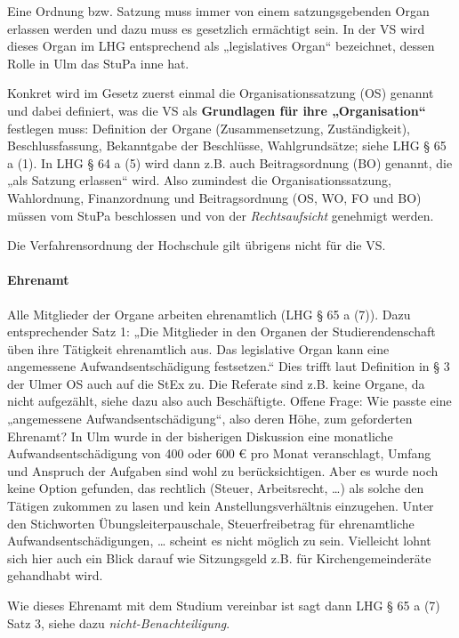 \documentclass[
10pt,
a4paper,
twoside,								%
titlepage=false,							%
draft=false								%
]{scrartcl}
\begin{document}
Eine Ordnung bzw. Satzung muss immer von einem satzungsgebenden Organ erlassen werden und dazu muss es gesetzlich ermächtigt sein. In der VS wird dieses Organ im LHG entsprechend als „legislatives Organ“ bezeichnet, dessen Rolle in Ulm das StuPa inne hat.


Konkret wird im Gesetz zuerst einmal die Organisationssatzung (OS) genannt und dabei definiert, was die VS als \textbf{Grundlagen für ihre „Organisation“} festlegen muss: Definition der Organe (Zusammensetzung, Zuständigkeit), Beschlussfassung, Bekanntgabe der Beschlüsse, Wahlgrundsätze; siehe LHG § 65 a (1). In LHG § 64 a (5) wird dann z.B. auch Beitragsordnung (BO) genannt, die „als Satzung erlassen“ wird. Also zumindest die Organisationssatzung, Wahlordnung, Finanzordnung und Beitragsordnung (OS, WO, FO und BO) müssen vom StuPa beschlossen und von der \emph{Rechtsaufsicht} genehmigt werden.

Die Verfahrensordnung der Hochschule gilt übrigens nicht für die VS.


\paragraph{Ehrenamt}

Alle Mitglieder der Organe arbeiten ehrenamtlich (LHG § 65 a (7)). Dazu entsprechender Satz 1: „Die Mitglieder in den Organen der Studierendenschaft üben ihre Tätigkeit ehrenamtlich aus. Das legislative Organ kann eine angemessene Aufwandsentschädigung festsetzen.“ Dies trifft laut Definition in § 3 der Ulmer OS auch auf die StEx zu. Die Referate sind z.B. keine Organe, da nicht aufgezählt, siehe dazu also auch Beschäftigte.
Offene Frage: Wie passte eine „angemessene Aufwandsentschädigung“, also deren Höhe, zum geforderten Ehrenamt? In Ulm wurde in der bisherigen Diskussion eine monatliche Aufwandsentschädigung von 400 oder 600 € pro Monat veranschlagt, Umfang und Anspruch der Aufgaben sind wohl zu berücksichtigen. Aber es wurde noch keine Option gefunden, das rechtlich (Steuer, Arbeitsrecht, …) als solche den Tätigen zukommen zu lasen und kein Anstellungsverhältnis einzugehen. Unter den Stichworten Übungsleiterpauschale, Steuerfreibetrag für ehrenamtliche Aufwandsentschädigungen, … scheint es nicht möglich zu sein. Vielleicht lohnt sich hier auch ein Blick darauf wie Sitzungsgeld z.B. für Kirchengemeinderäte gehandhabt wird.

Wie dieses Ehrenamt mit dem Studium vereinbar ist sagt dann LHG § 65 a (7) Satz 3, siehe dazu \emph{nicht-Benachteiligung}.
\end{document}
